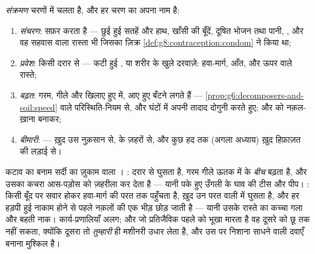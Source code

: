 \begin{definition}\label{def:g9:microbes-and-infection:stages}
\emph{संक्रमण} चरणों में चलता है, और हर चरण का अपना नाम
है:
\begin{enumerate}
  \item \emph{संचरण}:  सफ़र करता है --- छुई हुई सतहें और हाथ,
        खाँसी की बूँदें, दूषित भोजन तथा पानी, , और वह सहवास वाला
        रास्ता भी जिसका ज़िक्र \cref{def:g8:contraception:condom} ने
        किया था;
  \item \emph{प्रवेश}: किसी दरार से --- कटी हुई , या शरीर के खुले
        दरवाज़े: हवा-मार्ग, आँत, और ऊपर वाले रास्ते;
  \item \emph{बढ़त}: गरम, गीले और खिलाए हुए में, आए हुए बँटने लगते हैं
        ---  \cref{prop:g6:decomposers-and-soil:speed} वाले
        परिस्थिति-नियम से, और घंटों में अपनी तादाद दोगुनी करते हुए; और
          को नक़ल-ख़ाना बनाकर;
  \item \emph{बीमारी}:  --- ख़ुद उस नुक़सान से,  के
        ज़हरों से, और कुछ हद तक (अगला अध्याय) ख़ुद हिफ़ाज़त की लड़ाई
        से।
\end{enumerate}
\end{definition}

\begin{example}\label{ex:g9:microbes-and-infection:contrast}
कटाव का  बनाम सर्दी का ज़ुकाम वाला । : दरार से घुसता
है, गरम गीले ऊतक में  के \emph{बीच} बढ़ता है, और उसका कचरा
आस-पड़ोस को ज़हरीला कर देता है --- यानी पके हुए उँगली के घाव की टीस और
पीप। : किसी बूँद पर सवार होकर हवा-मार्ग की परत तक पहुँचता है, ख़ुद
उन परत वाली  में घुसता है, और हर हड़पी हुई  नाकाम होने से
पहले नक़लों की एक भीड़ छोड़ जाती है --- यानी उसके रास्ते का कच्चा गला और
बहती नाक। कार्य-प्रणालियाँ अलग; और जो प्रतिजैविक पहले को भूखा मारता है वह
दूसरे को छू तक नहीं सकता, क्योंकि दूसरा तो \emph{तुम्हारी} ही मशीनरी
उधार लेता है, और उस पर निशाना साधने वाली दवाएँ बनाना मुश्किल है।
\end{example}

